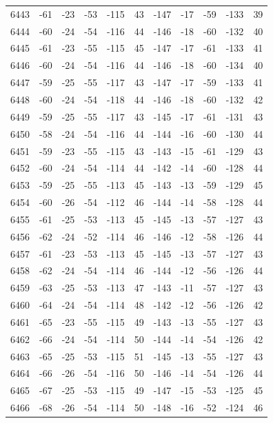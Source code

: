 \begin{table}[H]
\begin{tabular}{lllllllllll}
6443 & -61 & -23 & -53 & -115 & 43 & -147 & -17 & -59 & -133 & 39 \\
6444 & -60 & -24 & -54 & -116 & 44 & -146 & -18 & -60 & -132 & 40 \\
6445 & -61 & -23 & -55 & -115 & 45 & -147 & -17 & -61 & -133 & 41 \\
6446 & -60 & -24 & -54 & -116 & 44 & -146 & -18 & -60 & -134 & 40 \\
6447 & -59 & -25 & -55 & -117 & 43 & -147 & -17 & -59 & -133 & 41 \\
6448 & -60 & -24 & -54 & -118 & 44 & -146 & -18 & -60 & -132 & 42 \\
6449 & -59 & -25 & -55 & -117 & 43 & -145 & -17 & -61 & -131 & 43 \\
6450 & -58 & -24 & -54 & -116 & 44 & -144 & -16 & -60 & -130 & 44 \\
6451 & -59 & -23 & -55 & -115 & 43 & -143 & -15 & -61 & -129 & 43 \\
6452 & -60 & -24 & -54 & -114 & 44 & -142 & -14 & -60 & -128 & 44 \\
6453 & -59 & -25 & -55 & -113 & 45 & -143 & -13 & -59 & -129 & 45 \\
6454 & -60 & -26 & -54 & -112 & 46 & -144 & -14 & -58 & -128 & 44 \\
6455 & -61 & -25 & -53 & -113 & 45 & -145 & -13 & -57 & -127 & 43 \\
6456 & -62 & -24 & -52 & -114 & 46 & -146 & -12 & -58 & -126 & 44 \\
6457 & -61 & -23 & -53 & -113 & 45 & -145 & -13 & -57 & -127 & 43 \\
6458 & -62 & -24 & -54 & -114 & 46 & -144 & -12 & -56 & -126 & 44 \\
6459 & -63 & -25 & -53 & -113 & 47 & -143 & -11 & -57 & -127 & 43 \\
6460 & -64 & -24 & -54 & -114 & 48 & -142 & -12 & -56 & -126 & 42 \\
6461 & -65 & -23 & -55 & -115 & 49 & -143 & -13 & -55 & -127 & 43 \\
6462 & -66 & -24 & -54 & -114 & 50 & -144 & -14 & -54 & -126 & 42 \\
6463 & -65 & -25 & -53 & -115 & 51 & -145 & -13 & -55 & -127 & 43 \\
6464 & -66 & -26 & -54 & -116 & 50 & -146 & -14 & -54 & -126 & 44 \\
6465 & -67 & -25 & -53 & -115 & 49 & -147 & -15 & -53 & -125 & 45 \\
6466 & -68 & -26 & -54 & -114 & 50 & -148 & -16 & -52 & -124 & 46 \\

\end{tabular}
\end{table}
